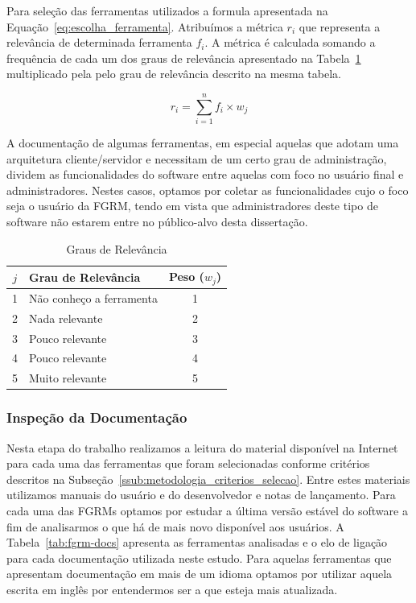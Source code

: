Para seleção das ferramentas utilizados a formula apresentada na
Equação~\ref{eq:escolha_ferramenta}.  Atribuímos a métrica $r_i$ que representa
a relevância de determinada ferramenta $f_i$. A métrica é calculada somando a
frequência de cada um dos graus de relevância apresentado na
Tabela~\ref{tab:graus_relevancia} multiplicado pela pelo grau de relevância
descrito na mesma tabela.

\begin{equation}
\label{eq:escolha_ferramenta}
r_i = \sum_{i=1}^{n} f_i \times w_j
\end{equation}

A documentação de algumas ferramentas, em especial aquelas que adotam uma
arquitetura cliente/servidor e necessitam de um certo grau de administração,
dividem as funcionalidades do software entre aquelas com foco no usuário final e
ad\-mi\-nis\-tra\-do\-res. Nestes casos, optamos por coletar as funcionalidades
cujo o foco seja o usuário da FGRM, tendo em vista que administradores deste
tipo de software não estarem entre no público-alvo desta dissertação.

\begin{table}[htpb]
\centering
\begin{tabular}{@{}clc@{}}
\toprule
\textbf{$j$} & \textbf{Grau de Relevância} & \textbf{Peso ($w_j$)} \\ \midrule
1 & Não conheço a ferramenta & 1 \\
2 & Nada relevante & 2 \\
3 & Pouco relevante & 3 \\
4 & Pouco relevante & 4 \\
5 & Muito relevante & 5 \\ \bottomrule
\end{tabular}
\caption{Graus de Relevância}
\label{tab:graus_relevancia}
\end{table}

\subsubsection{Inspeção da Documentação}
\label{subsec:inspecao_doumentacao}

Nesta etapa do trabalho realizamos a leitura do material disponível na Internet
para cada uma das ferramentas que foram selecionadas conforme critérios
descritos na Subseção~\ref{ssub:metodologia_criterios_selecao}. Entre estes
materiais utilizamos manuais do usuário e do desenvolvedor e notas de
lançamento. Para cada uma das FGRMs optamos por estudar a última versão estável
do software a fim de analisarmos o que há de mais novo disponível aos usuários.
A Tabela~\ref{tab:fgrm-docs} apresenta as ferramentas analisadas e o elo de
ligação para cada documentação utilizada neste estudo. Para aquelas ferramentas
que apresentam documentação em mais de um i\-di\-o\-ma optamos por utilizar
aquela escrita em inglês por entendermos ser a que esteja mais atualizada.

